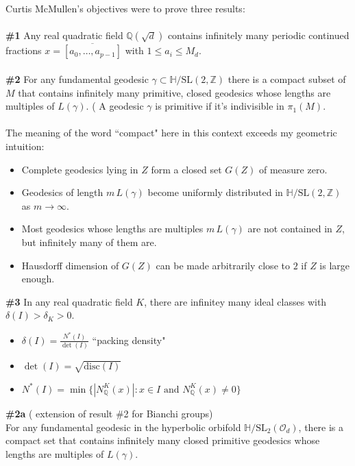 \documentclass[12pt]{article}
\begin{document}
\noindent Curtis McMullen's objectives were to prove three results: \\ \\
\textbf{\#1} Any real quadratic field $\mathbb{Q}(\sqrt{d})$ contains infinitely many periodic continued fractions $x = \overline{[a_0, \dots, a_{p-1}]}$ with $1 \leq a_i \leq M_d$. \\ \\
\textbf{\#2} For any fundamental geodesic $\gamma \subset \mathbb{H}/\mathrm{SL}(2, \mathbb{Z})$ there is a compact subset of $M$ that contains infinitely many primitive, closed geodesics whose lengths are multiples of $L(\gamma)$.  ( A geodesic $\gamma$ is primitive if it's indivisible in $\pi_1(M)$. \\ \\
The meaning of the word ``compact" here in this context exceeds my geometric intuition:
\begin{itemize}
\item Complete geodesics lying in $Z$ form a closed set $G(Z)$ of measure zero.
\item Geodesics of length $m \, L(\gamma)$ become uniformly distributed in $\mathbb{H}/\mathrm{SL}(2, \mathbb{Z})$ as $m \to \infty$.
\item Most geodesics whose lengths are multiples $m \, L(\gamma)$ are not contained in $Z$, but infinitely many of them are.
\item Hausdorff dimension of $G(Z)$ can be made arbitrarily close to $2$ if $Z$ is large enough.
\end{itemize}
\textbf{\#3} In any real quadratic field $K$, there are infinitey many ideal classes with $\delta(I) > \delta_K > 0$.  
\begin{itemize}
\item $\delta(I) = \frac{N^\ast(I)}{\det (I) }$ ``packing density"
\item $\det (I) = \sqrt{\mathrm{disc}(I) }$ 
\item $N^\ast(I) = \min \big\{ | N^K_\mathbb{Q}(x) |: x \in I \text{ and } N^K_\mathbb{Q}(x) \neq 0 \big\}  $ \\
\end{itemize}
\textbf{\#2a} ({ \color{black!30!white} extension of result \#2 for Bianchi groups}) \\ For any fundamental geodesic in the hyperbolic orbifold $\mathbb{H}/ \mathrm{SL}_2(\mathcal{O}_d)$, there is a compact set that contains infinitely many closed primitive geodesics whose lengths are multiples of $L(\gamma)$. 
\end{document}
